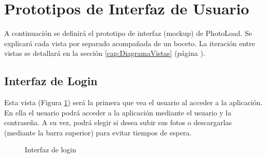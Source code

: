 \documentclass{scrartcl}
\begin{document}
\section{Prototipos de Interfaz de Usuario}\label{cap:prototipos interfaz}
A continuación se definirá el prototipo de interfaz (mockup) de PhotoLoad. Se explicará cada vista por separado acompañada de un boceto. La iteración entre vistas se detallará en la sección \ref{cap:DiagramaVistas} (página \pageref{cap:DiagramaVistas}).
\subsection{Interfaz de Login}
Esta vista (Figura \ref{fig:VistaLogin}) será la primera que vea el usuario al acceder a la aplicación. En ella el usuario podrá acceder a la aplicación mediante el usuario y la contraseña. A su vez, podrá elegir si desea subir sus fotos o descargarlas (mediante la barra superior) para evitar tiempos de espera.

\begin{figure}[H]
	
	\centering
	\caption{Interfaz de login}
	\label{fig:VistaLogin}
	
\end{figure}

\vspace*{2in}
\end{document}
